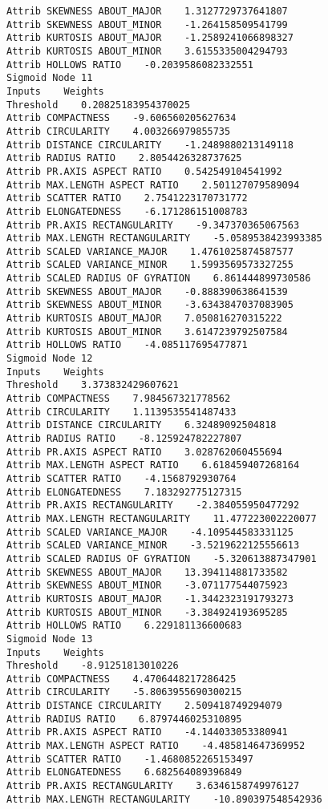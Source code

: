 \documentclass[
	article,			%
	11pt,				%
	oneside,			%
	a4paper,			%
	english,			%
	brazil,				%
	sumario=tradicional
	]{abntex2}
\begin{document}
\begin{lstlisting}
Attrib SKEWNESS ABOUT_MAJOR    1.3127729737641807
Attrib SKEWNESS ABOUT_MINOR    -1.264158509541799
Attrib KURTOSIS ABOUT_MAJOR    -1.2589241066898327
Attrib KURTOSIS ABOUT_MINOR    3.6155335004294793
Attrib HOLLOWS RATIO    -0.2039586082332551
Sigmoid Node 11
Inputs    Weights
Threshold    0.20825183954370025
Attrib COMPACTNESS    -9.606560205627634
Attrib CIRCULARITY    4.003266979855735
Attrib DISTANCE CIRCULARITY    -1.2489880213149118
Attrib RADIUS RATIO    2.8054426328737625
Attrib PR.AXIS ASPECT RATIO    0.542549104541992
Attrib MAX.LENGTH ASPECT RATIO    2.501127079589094
Attrib SCATTER RATIO    2.7541223170731772
Attrib ELONGATEDNESS    -6.171286151008783
Attrib PR.AXIS RECTANGULARITY    -9.347370365067563
Attrib MAX.LENGTH RECTANGULARITY    -5.0589538423993385
Attrib SCALED VARIANCE_MAJOR    1.4761025874587577
Attrib SCALED VARIANCE_MINOR    1.5993569573327255
Attrib SCALED RADIUS OF GYRATION    6.861444899730586
Attrib SKEWNESS ABOUT_MAJOR    -0.888390638641539
Attrib SKEWNESS ABOUT_MINOR    -3.6343847037083905
Attrib KURTOSIS ABOUT_MAJOR    7.050816270315222
Attrib KURTOSIS ABOUT_MINOR    3.6147239792507584
Attrib HOLLOWS RATIO    -4.085117695477871
Sigmoid Node 12
Inputs    Weights
Threshold    3.373832429607621
Attrib COMPACTNESS    7.984567321778562
Attrib CIRCULARITY    1.1139535541487433
Attrib DISTANCE CIRCULARITY    6.32489092504818
Attrib RADIUS RATIO    -8.125924782227807
Attrib PR.AXIS ASPECT RATIO    3.028762060455694
Attrib MAX.LENGTH ASPECT RATIO    6.618459407268164
Attrib SCATTER RATIO    -4.1568792930764
Attrib ELONGATEDNESS    7.183292775127315
Attrib PR.AXIS RECTANGULARITY    -2.384055950477292
Attrib MAX.LENGTH RECTANGULARITY    11.477223002220077
Attrib SCALED VARIANCE_MAJOR    -4.109544583331125
Attrib SCALED VARIANCE_MINOR    -3.5219622125556613
Attrib SCALED RADIUS OF GYRATION    -5.320613887347901
Attrib SKEWNESS ABOUT_MAJOR    13.394114881733582
Attrib SKEWNESS ABOUT_MINOR    -3.071177544075923
Attrib KURTOSIS ABOUT_MAJOR    -1.3442323191793273
Attrib KURTOSIS ABOUT_MINOR    -3.384924193695285
Attrib HOLLOWS RATIO    6.229181136600683
Sigmoid Node 13
Inputs    Weights
Threshold    -8.91251813010226
Attrib COMPACTNESS    4.4706448217286425
Attrib CIRCULARITY    -5.8063955690300215
Attrib DISTANCE CIRCULARITY    2.509418749294079
Attrib RADIUS RATIO    6.8797446025310895
Attrib PR.AXIS ASPECT RATIO    -4.144033053380941
Attrib MAX.LENGTH ASPECT RATIO    -4.485814647369952
Attrib SCATTER RATIO    -1.4680852265153497
Attrib ELONGATEDNESS    6.682564089396849
Attrib PR.AXIS RECTANGULARITY    3.6346158749976127
Attrib MAX.LENGTH RECTANGULARITY    -10.890397548542936

\end{lstlisting}
\end{document}
